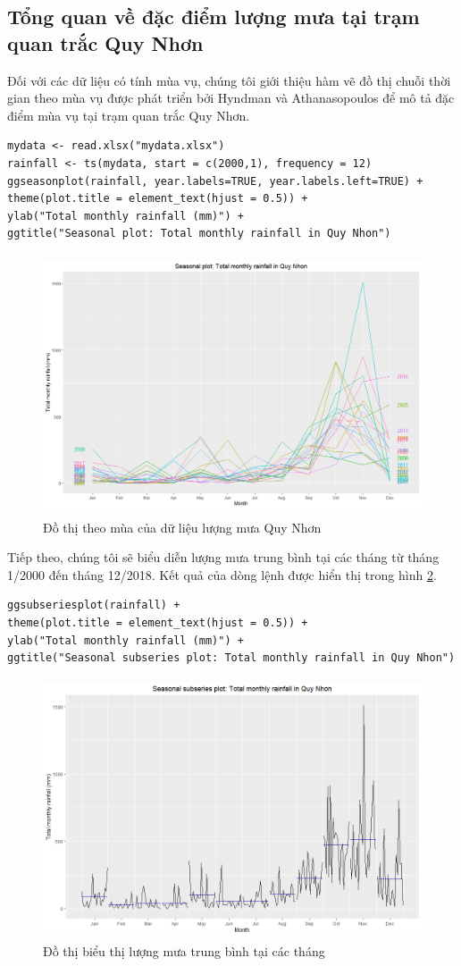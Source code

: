 \documentclass[12pt, a4paper,oneside]{book}
\theoremstyle{definition}
\begin{document}
\subsection{Tổng quan về đặc điểm lượng mưa tại trạm quan trắc Quy Nhơn}
Đối với các dữ liệu có tính mùa vụ, chúng tôi giới thiệu hàm vẽ đồ thị chuỗi thời gian theo mùa vụ được phát triển bởi Hyndman và Athanasopoulos để mô tả đặc điểm mùa vụ tại trạm quan trắc Quy Nhơn.
\begin{lstlisting}
mydata <- read.xlsx("mydata.xlsx")
rainfall <- ts(mydata, start = c(2000,1), frequency = 12)
ggseasonplot(rainfall, year.labels=TRUE, year.labels.left=TRUE) +
theme(plot.title = element_text(hjust = 0.5)) +  
ylab("Total monthly rainfall (mm)") +
ggtitle("Seasonal plot: Total monthly rainfall in Quy Nhon")
\end{lstlisting}
\begin{figure}[!htb]
	\centering
	\includegraphics[width=1\linewidth,height=7.7cm]{anh/V2}
	\vskip-4mm 
	\caption{Đồ thị theo mùa của dữ liệu lượng mưa Quy Nhơn}  
	\label{V2}
\end{figure}
Tiếp theo, chúng tôi sẽ biểu diễn lượng mưa trung bình tại các tháng từ tháng 1/2000 đến tháng 12/2018. Kết quả của dòng lệnh được hiển thị trong hình \ref{V4}.
\begin{lstlisting}
ggsubseriesplot(rainfall) +
theme(plot.title = element_text(hjust = 0.5)) + 
ylab("Total monthly rainfall (mm)") +
ggtitle("Seasonal subseries plot: Total monthly rainfall in Quy Nhon")
\end{lstlisting}
\begin{figure}[!htb]
	\centering
	\includegraphics[width=1\linewidth,height=7.7cm]{anh/V4}
	\vskip-4mm 
	\caption{Đồ thị biểu thị lượng mưa trung bình tại các tháng}  
	\label{V4}
\end{figure}
\end{document}
